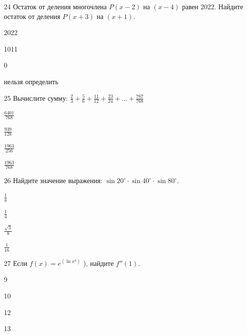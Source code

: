 \documentclass[14pt]{article}
\begin{document}
\begin{questionbox}{24}
    Остаток от деления многочлена \(P(x-2)\) на \((x-4)\) равен 2022. Найдите остаток от деления \(P(x+3)\) на \((x+1)\).
    \begin{options}
        \item 2022
        \item 1011
        \item 0
        \item нельзя определить
    \end{options}
\end{questionbox}

\begin{questionbox}{25}
    Вычислите сумму: \(\frac{2}{3} + \frac{5}{6} + \frac{11}{12} + \frac{23}{24} + \dots + \frac{767}{768}\) 
    \begin{options}
        \item \(\frac{6401}{768}\)
        \item \(\frac{939}{128}\)
        \item \(\frac{1963}{256}\)
        \item \(\frac{1963}{768}\)
    \end{options}
\end{questionbox}

\begin{questionbox}{26}
    Найдите значение выражения: \(\sin 20^\circ \cdot \sin 40^\circ \cdot \sin 80^\circ\).
    \begin{options}
        \item \(\frac{1}{8}\)
        \item \(\frac{1}{4}\)
        \item \(\frac{\sqrt{3}}{8}\)
        \item \(\frac{1}{16}\)
    \end{options}
\end{questionbox}

\begin{questionbox}{27}
   Если \(f(x) = e^{(\ln x^4)}\) ), найдите \(f''(1)\).
    \begin{options}
        \item 9
        \item 10
        \item 12
        \item 13
    \end{options}
\end{questionbox}
\end{document}
